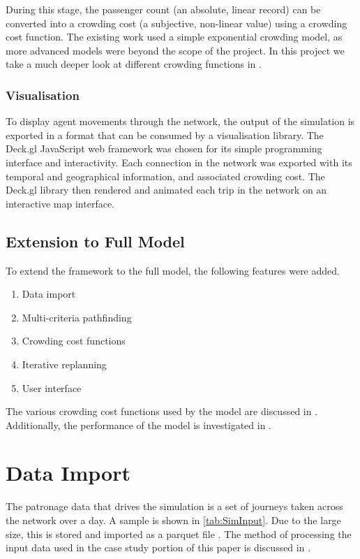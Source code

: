 During this stage, the passenger count (an absolute, linear record) can be converted into a crowding cost (a subjective, non-linear value) using a crowding cost function. The existing work used a simple exponential crowding model, as more advanced models were beyond the scope of the project. In this project we take a much deeper look at different crowding functions in .

\subsubsection{Visualisation}
To display agent movements through the network, the output of the simulation is exported in a format that can be consumed by a visualisation library. The Deck.gl JavaScript web framework \cite{VisglDeckGl2024} was chosen for its simple programming interface and interactivity. Each connection in the network was exported with its temporal and geographical information, and associated crowding cost. The Deck.gl library then rendered and animated each trip in the network on an interactive map interface.

\subsection{Extension to Full Model}
To extend the framework to the full model, the following features were added.
\begin{SingleSpacing}
    \begin{enumerate}
        \item Data import
        \item Multi-criteria pathfinding 
        \item Crowding cost functions 
        \item Iterative replanning
        \item User interface
    \end{enumerate}
\end{SingleSpacing}

The various crowding cost functions used by the model are discussed in .
Additionally, the performance of the model is investigated in .

\section{Data Import}
\label{sec:DataImport}
The patronage data that drives the simulation is a set of journeys taken across the network over a day. A sample is shown in \autoref{tab:SimInput}. Due to the large size, this is stored and imported as a parquet file \cite{apachesoftwarefoundationParquet2024}. The method of processing the input data used in the case study portion of this paper is discussed in .


